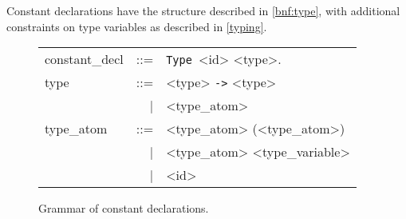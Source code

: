 Constant declarations have the structure described in
\autoref{bnf:type}, with additional constraints on type variables as
described in \autoref{typing}.
\begin{figure}[ht]
  \centering
  \begin{tabular}{lrl}
    constant\_decl &::=& \lstinline!Type !<id> <type>. \\
    type           &::=& <type> \lstinline!->! <type> \\
                   & | & <type\_atom> \\
    type\_atom     &::=& <type\_atom> (<type\_atom>) \\
                   & | & <type\_atom> <type\_variable> \\
                   & | & <id> \\
  \end{tabular}
  \caption{Grammar of constant declarations.\label{bnf:type}}
\end{figure}

